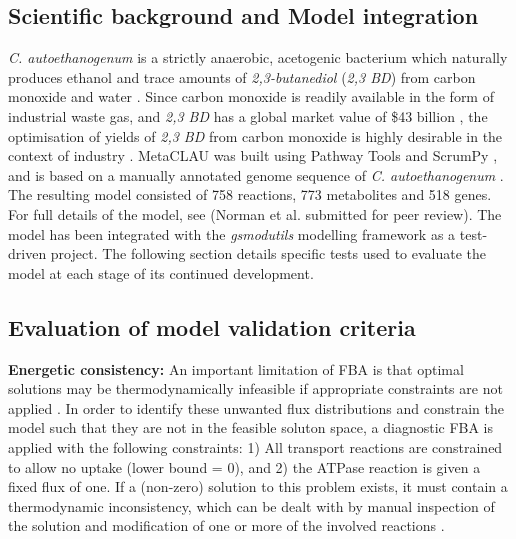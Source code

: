 \documentclass[journal=asbcd6,10pt]{achemso}
\begin{document}
\subsection{Scientific background and Model integration}

\textit{C. autoethanogenum} is a strictly anaerobic, acetogenic bacterium which naturally produces ethanol and trace amounts of \textit{2,3-butanediol} (\textit{2,3 BD}) from carbon monoxide and water \cite{abrini1994clostridium,schuchmann2014autotrophy,norman2018progress}. Since carbon monoxide is readily available in the form of industrial waste gas, and \textit{2,3 BD} has a global market value of \$43 billion \cite{kopke201123butanediol}, the optimisation of yields of \textit{2,3 BD} from carbon monoxide is highly desirable in the context of industry \cite{norman2018progress}.   
MetaCLAU was built using Pathway Tools \cite{karp2002pathway} and ScrumPy \cite{poolman2006scrumpy}, and is based on a manually annotated genome sequence of \textit{C. autoethanogenum} \cite{humphreys2015whole}. The resulting model consisted of 758 reactions, 773 metabolites and 518 genes. For full details of the model, see (Norman et al. submitted for peer review).
The model has been integrated with the \textit{gsmodutils} modelling framework as a test-driven project. The following section details specific tests used to evaluate the model at each stage of its continued development.

\subsection{Evaluation of model validation criteria}
\textbf{Energetic consistency:} 
An important limitation of FBA is that optimal solutions may be thermodynamically infeasible if appropriate constraints are not applied \cite{Fell1197rohtua}.
In order to identify these unwanted flux distributions and constrain the model such that they are not in the feasible soluton space, a diagnostic FBA is applied with the following constraints:
1) All transport reactions are constrained to allow no uptake (lower bound = 0), and 2) the ATPase reaction is given a fixed flux of one.
If a (non-zero) solution to this problem exists, it must contain a thermodynamic inconsistency, which can be dealt with by manual inspection of the solution and modification of one or more of the involved reactions \cite{Fell1197rohtua}.
 
\end{document}
